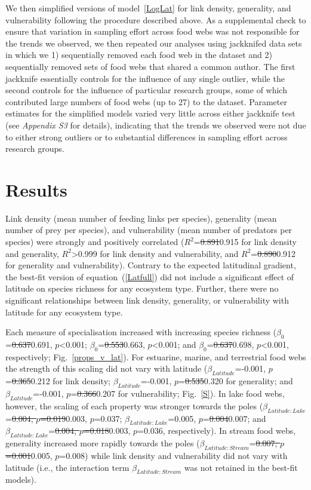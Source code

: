 \documentclass[12pt]{article}
\begin{document}
    We then simplified versions of model~\ref{LogLat} for link density, generality, and vulnerability following the procedure described above.
    As a supplemental check to ensure that variation in sampling effort
    across food webs was not responsible for the trends we observed, we then
    repeated our analyses using jackknifed data sets in which we 1) sequentially
    removed each food web in the dataset and 2) sequentially removed sets of food webs
    that shared a common author. The first jackknife essentially controls for the
    influence of any single outlier, while the second controls for the influence
    of particular research groups, some of which contributed large numbers of food
    webs (up to 27) to the dataset. Parameter estimates for the simplified models 
    varied very little across either jackknife test (see \emph{Appendix S3} for details),
    indicating that the trends we observed were not due to either strong outliers or
    to substantial differences in sampling effort across research groups.


\section*{Results}

  Link density (mean number of feeding links per species), generality (mean
  number of prey per species), and vulnerability (mean number of predators per
  species) were strongly and positively correlated ($R^2$=\st{0.891}0.915 for link
  density and generality, $R^2$\textgreater0.999 for link density and
  vulnerability, and $R^2$=\st{0.890}0.912 for generality and vulnerability). Contrary
  to the expected latitudinal gradient, the best-fit version of
  equation~(\ref{Latfull}) did not include a significant
  effect of latitude on species richness for any ecosystem type. Further, there were no significant
  relationships between link density, generality, or vulnerability with
  latitude for any ecosystem type.


  Each measure of specialisation increased with increasing
  species richness ($\beta_0$=\st{0.637}0.691, $p$\textless0.001; $\beta_0$=\st{0.553}0.663,
  $p$\textless0.001; and $\beta_0$=\st{0.637}0.698, $p$\textless0.001, respectively;
  Fig.~\ref{props_v_lat}). For estuarine, marine, and terrestrial food webs the
  strength of this scaling did not vary with latitude
  ($\beta_{Latitude}$=-0.001, $p$=\st{0.365}0.212 for link density;
  $\beta_{Latitude}$=-0.001, $p$=\st{0.535}0.320 for generality; and
  $\beta_{Latitude}$=-0.001, $p$=\st{0.366}0.207 for vulnerability; Fig.~\ref{S}). In
  lake food webs, however, the scaling of each property was stronger towards
  the poles ($\beta_{Latitude:Lake}$=\st{0.004, $p$=0.019}0.003, $p$=0.037;
  $\beta_{Latitude:Lake}$=0.005, $p$=\st{0.004}0.007; and
  $\beta_{Latitude:Lake}$=\st{0.004, $p$=0.018}0.003, $p$=0.036, respectively). In stream food
  webs, generality increased more rapidly towards the poles
  ($\beta_{Latitude:Stream}$=\st{0.007, $p$=0.001}0.005, $p$=0.008) while link density and
  vulnerability did not vary with latitude (i.e., the interaction term 
  $\beta_{Latitude:Stream}$ was not retained in the best-fit models).
\end{document}
